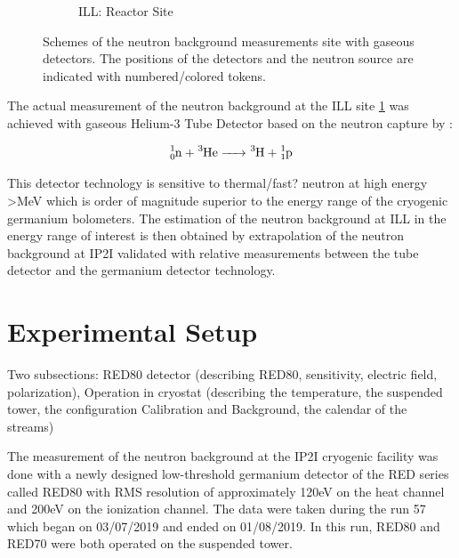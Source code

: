 \begin{figure}
\begin{subfigure}{0.5\textwidth}
  \caption{ILL: Reactor Site}
  \label{fig:scheme-ill}
\end{subfigure}
\caption{Schemes of the neutron background measurements site with  gaseous detectors. The positions of the detectors and the neutron source are indicated with numbered/colored tokens.}
\label{fig:scheme-site}
\end{figure}

The actual measurement of the neutron background at the ILL site \ref{fig:scheme-ill} was achieved with gaseous Helium-3 Tube Detector based on the neutron capture by :

\begin{equation}
	\ce{^1_0n + ^3He -> ^3H + ^1_1p}
\end{equation}

This detector technology is sensitive to thermal/fast? neutron at high energy >MeV which is order of magnitude superior to the energy range of the cryogenic germanium bolometers.
The estimation of the neutron background at ILL in the energy range of interest is then obtained by extrapolation of the neutron background at IP2I validated with relative measurements between the tube detector and the germanium detector technology.


\section{Experimental Setup}

{\color{red} Two subsections: RED80 detector (describing RED80, sensitivity, electric field, polarization), Operation in cryostat (describing the temperature, the suspended tower, the configuration Calibration and Background, the calendar of the streams)}

The measurement of the neutron background at the IP2I cryogenic facility was done with a newly designed low-threshold germanium detector of the RED series called RED80 with RMS resolution of approximately 120eV on the heat channel and 200eV on the ionization channel.
The data were taken during the run 57 which began on 03/07/2019 and ended on 01/08/2019. In this run, RED80 and RED70 were both operated on the suspended tower.

